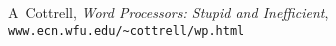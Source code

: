 \begin{thebibliography}{9999}%

A~Cottrell,
	\textsl{Word Processors: Stupid and Inefficient},
	\\ \mbox{}\hfill\texttt{www.ecn.wfu.edu/\~{}cottrell/wp.html}

\end{thebibliography}
